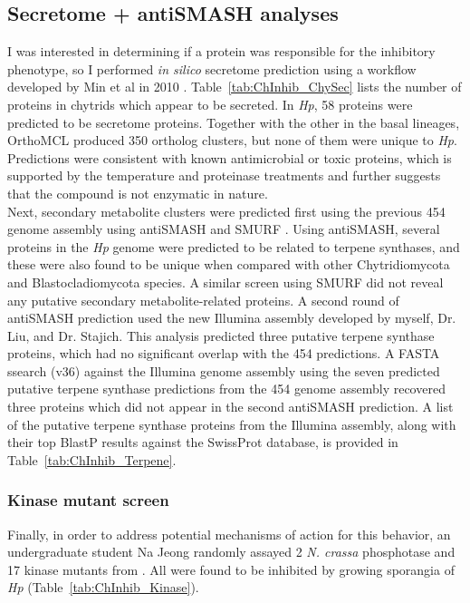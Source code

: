 \subsection*{Secretome + antiSMASH analyses}
I was interested in determining if a protein was responsible for the inhibitory phenotype, so I performed \textit{in silico} secretome prediction using a workflow developed by Min et al in 2010 \nocite{Min2010}. Table~\ref{tab:ChInhib_ChySec} lists the number of proteins in chytrids which appear to be secreted. In \textit{Hp}, 58 proteins were predicted to be secretome proteins. Together with the other in the basal lineages, OrthoMCL produced 350 ortholog clusters, but none of them were unique to \textit{Hp}. Predictions were consistent with known antimicrobial or toxic proteins, which is supported by the temperature and proteinase treatments and further suggests that the compound is not enzymatic in nature.\\
\indent Next, secondary metabolite clusters were predicted first using the previous 454 genome assembly using antiSMASH \cite{Blin2013} and SMURF \cite{Khaldi2010}. Using antiSMASH, several proteins in the \textit{Hp} genome were predicted to be related to terpene synthases, and these were also found to be unique when compared with other Chytridiomycota and Blastocladiomycota species. A similar screen using SMURF did not reveal any putative secondary metabolite-related proteins. A second round of antiSMASH prediction used the new Illumina assembly developed by myself, Dr. Liu, and Dr. Stajich. This analysis predicted three putative terpene synthase proteins, which had no significant overlap with the 454 predictions. A FASTA ssearch (v36) against the Illumina genome assembly using the seven predicted putative terpene synthase predictions from the 454 genome assembly recovered three proteins which did not appear in the second antiSMASH prediction. A list of the putative terpene synthase proteins from the Illumina assembly, along with their top BlastP results against the SwissProt database, is provided in Table~\ref{tab:ChInhib_Terpene}.\\
\subsubsection*{Kinase mutant screen}
Finally, in order to address potential mechanisms of action for this behavior, an undergraduate student Na Jeong randomly assayed 2 \textit{N. crassa} phosphotase and 17 kinase mutants from \cite{Park2011}. All were found to be inhibited by growing sporangia of \textit{Hp} (Table~\ref{tab:ChInhib_Kinase}).\\

